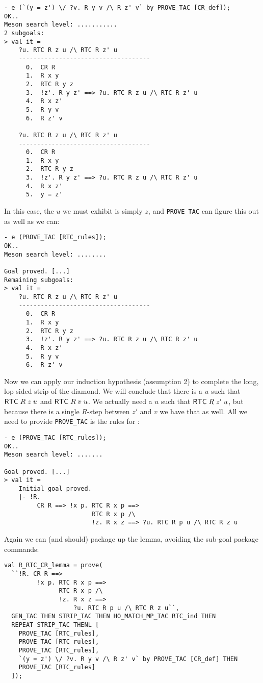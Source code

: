 \documentclass[12pt]{article}
\begin{document}
\begin{session}\begin{verbatim}
- e (`(y = z') \/ ?v. R y v /\ R z' v` by PROVE_TAC [CR_def]);
OK..
Meson search level: ...........
2 subgoals:
> val it =
    ?u. RTC R z u /\ RTC R z' u
    ------------------------------------
      0.  CR R
      1.  R x y
      2.  RTC R y z
      3.  !z'. R y z' ==> ?u. RTC R z u /\ RTC R z' u
      4.  R x z'
      5.  R y v
      6.  R z' v

    ?u. RTC R z u /\ RTC R z' u
    ------------------------------------
      0.  CR R
      1.  R x y
      2.  RTC R y z
      3.  !z'. R y z' ==> ?u. RTC R z u /\ RTC R z' u
      4.  R x z'
      5.  y = z'
\end{verbatim}\end{session}
In this case, the $u$ we must exhibit is simply $z$, and
\texttt{PROVE\_TAC} can figure this out as well as we can:
\begin{session}\begin{verbatim}
- e (PROVE_TAC [RTC_rules]);
OK..
Meson search level: ........

Goal proved. [...]
Remaining subgoals:
> val it =
    ?u. RTC R z u /\ RTC R z' u
    ------------------------------------
      0.  CR R
      1.  R x y
      2.  RTC R y z
      3.  !z'. R y z' ==> ?u. RTC R z u /\ RTC R z' u
      4.  R x z'
      5.  R y v
      6.  R z' v
\end{verbatim}\end{session}
Now we can apply our induction hypothesis (assumption 2) to complete
the long, lop-sided strip of the diamond.  We will conclude that there
is a $u$ such that ${\sf RTC}\;R\;z\;u$ and ${\sf RTC}\;R\;v\;u$.  We
actually need a $u$ such that ${\sf RTC}\;R\;z'\;u$, but because there
is a single $R$-step between $z'$ and $v$ we have that as well.  All
we need to provide \texttt{PROVE\_TAC} is the rules for :
\begin{session}\begin{verbatim}
- e (PROVE_TAC [RTC_rules]);
OK..
Meson search level: .......

Goal proved. [...]
> val it =
    Initial goal proved.
    |- !R.
         CR R ==> !x p. RTC R x p ==>
                        RTC R x p /\
                        !z. R x z ==> ?u. RTC R p u /\ RTC R z u
\end{verbatim}\end{session}
    Again we can (and should) package up the lemma, avoiding the
    sub-goal package commands:
\begin{session}\begin{verbatim}
val R_RTC_CR_lemma = prove(
  ``!R. CR R ==>
         !x p. RTC R x p ==>
               RTC R x p /\
               !z. R x z ==>
                   ?u. RTC R p u /\ RTC R z u``,
  GEN_TAC THEN STRIP_TAC THEN HO_MATCH_MP_TAC RTC_ind THEN
  REPEAT STRIP_TAC THENL [
    PROVE_TAC [RTC_rules],
    PROVE_TAC [RTC_rules],
    PROVE_TAC [RTC_rules],
    `(y = z') \/ ?v. R y v /\ R z' v` by PROVE_TAC [CR_def] THEN
    PROVE_TAC [RTC_rules]
  ]);
\end{verbatim}\end{session}
\end{document}
